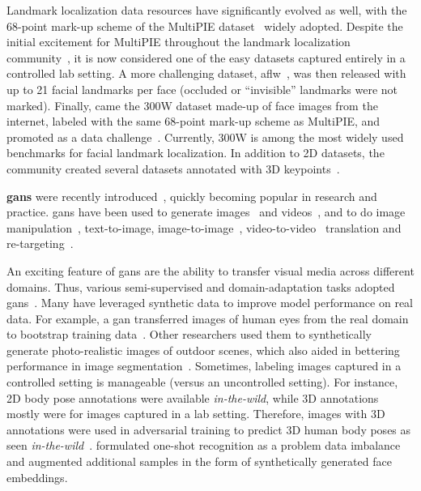 \documentclass[10pt,twocolumn,letterpaper]{article}
\begin{document}
Landmark localization data resources have significantly evolved as well, with the 68-point mark-up scheme of the MultiPIE dataset~\cite{gross2010multi} widely adopted. Despite the initial excitement for MultiPIE throughout the landmark localization community~\cite{zhu2012face}, it is now considered one of the easy datasets captured entirely in a controlled lab setting. A more challenging dataset, \gls{aflw}~\cite{koestinger2011annotated}, was then released with up to 21 facial landmarks per face (\ie occluded or ``invisible'' landmarks were not marked). Finally, came the 300W dataset made-up of face images from the internet, labeled with the same 68-point mark-up scheme as MultiPIE, and promoted as a data challenge~\cite{sagonas2013300}. Currently, 300W is among the most widely used benchmarks for facial landmark localization. In addition to 2D datasets, the community created several datasets annotated with 3D keypoints~\cite{bulat2017far}.

\textbf{\Glspl{gan}} were recently introduced~\cite{goodfellow2014generative}, quickly becoming popular in research and practice. \Glspl{gan} have been used to generate images~\cite{radford2015unsupervised} and videos~\cite{saito2017temporal,tulyakov2017mocogan}, and to do image manipulation~\cite{geng20193d}, text-to-image\cite{han2017stackgan}, image-to-image~\cite{zhu2017unpaired}, video-to-video~\cite{wang2018vid2vid} translation and re-targeting~\cite{siarohin2018animating}.


An exciting feature of \Glspl{gan} are the ability to transfer visual media across different domains. Thus, various semi-supervised and domain-adaptation tasks adopted \Glspl{gan}~\cite{ding2018one, hoffman2017cycada, shrivastava2017learning, yang20183d}. Many have leveraged synthetic data to improve model performance on real data. For example, a \gls{gan} transferred images of human eyes from the real domain to bootstrap training data~\cite{shrivastava2017learning}. Other researchers used them to synthetically generate photo-realistic images of outdoor scenes, which also aided in bettering performance in image segmentation~\cite{hoffman2017cycada}. Sometimes, labeling images captured in a controlled setting is manageable (\ie versus an uncontrolled setting). For instance, 2D body pose annotations were available \textit{in-the-wild}, while 3D annotations mostly were for images captured in a lab setting. Therefore, images with 3D annotations were used in adversarial training to predict 3D human body poses as seen \textit{in-the-wild}~\cite{yang20183d}. \cite{ding2018one} formulated one-shot recognition as a problem data imbalance and augmented additional samples in the form of synthetically generated face embeddings.
\end{document}
